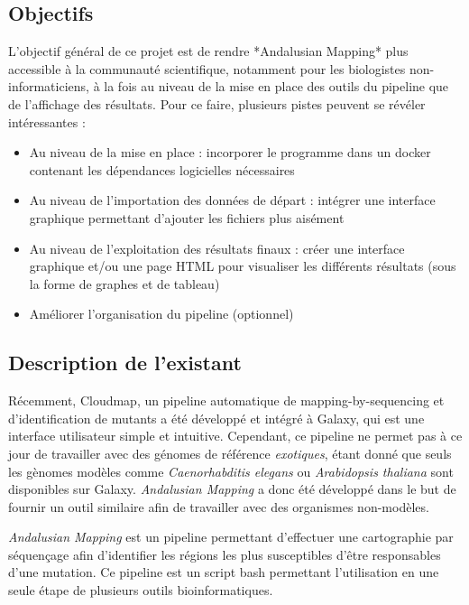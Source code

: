 \documentclass[12pt]{article}
\begin{document}
\subsection{Objectifs}

L'objectif général de ce projet est de rendre *Andalusian Mapping* plus accessible à la communauté scientifique, notamment pour les biologistes non-informaticiens, à la fois au niveau de la mise en place des outils du pipeline que de l'affichage des résultats.  
Pour ce faire, plusieurs pistes peuvent se révéler intéressantes : 

\begin{itemize}
\item Au niveau de la mise en place : incorporer le programme dans un docker contenant les dépendances logicielles nécessaires
\item Au niveau de l'importation des données de départ : intégrer une interface graphique permettant d'ajouter les fichiers plus aisément
\item Au niveau de l'exploitation des résultats finaux : créer une interface graphique et/ou une page HTML pour visualiser les différents résultats (sous la forme de graphes et de tableau)
\item Améliorer l'organisation du pipeline (optionnel) 
\end{itemize}

\subsection{Description de l'existant}

Récemment, Cloudmap, un pipeline automatique de mapping-by-sequencing et d'identification de mutants a été développé et intégré à Galaxy, qui est une interface utilisateur simple et intuitive.
Cependant, ce pipeline ne permet pas à ce jour de travailler avec des génomes de référence \textit{exotiques}, étant donné que seuls les gènomes modèles comme \textit{Caenorhabditis elegans} ou \textit{Arabidopsis thaliana} sont disponibles sur Galaxy.
\textit{Andalusian Mapping} a donc été développé dans le but de fournir un outil similaire afin de travailler avec des organismes non-modèles.

\textit{Andalusian Mapping} est un pipeline permettant d'effectuer une cartographie par séquençage afin d'identifier les régions les plus susceptibles d'être responsables d'une mutation.
Ce pipeline est un script bash permettant l'utilisation en une seule étape de plusieurs outils bioinformatiques. \\
\end{document}
